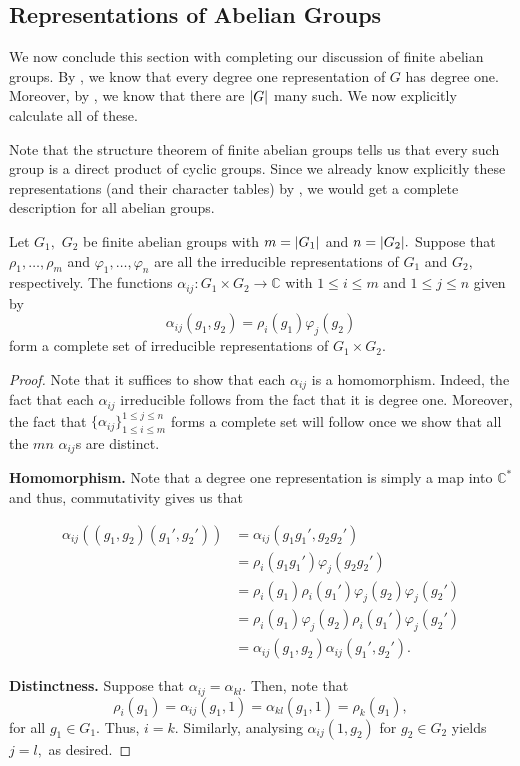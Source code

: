 \subsection{Representations of Abelian Groups}
We now conclude this section with completing our discussion of finite abelian groups. By , we know that every degree one representation of $G$ has degree one. Moreover, by , we know that there are ${\left\lvert G \right\lvert}$ many such. We now explicitly calculate all of these.

Note that the structure theorem of finite abelian groups tells us that every such group is a direct product of cyclic groups. Since we already know explicitly these representations (and their character tables) by , we would get a complete description for all abelian groups.

\begin{prop}
	Let $G_1,$ $G_2$ be finite abelian groups with $m = {\left\lvert G_1 \right\lvert}$ and $n = {\left\lvert G_2 \right\lvert}.$ Suppose that $\rho_1, \ldots, \rho_m$ and $\varphi_1, \ldots, \varphi_n$ are all the irreducible representations of $G_1$ and $G_2,$ respectively. The functions $\alpha_{ij} : G_1 \times G_2 \to \mathbb{C}$ with $1 \le i \le m$ and $1 \le j \le n$ given by
	\begin{equation*} 
		\alpha_{ij}(g_1, g_2) = \rho_i(g_1)\varphi_j(g_2)
	\end{equation*}
	form a complete set of irreducible representations of $G_1 \times G_2.$
\end{prop}
\begin{proof} 
	Note that it suffices to show that each $\alpha_{ij}$ is a homomorphism. Indeed, the fact that each $\alpha_{ij}$ irreducible follows from the fact that it is degree one. Moreover, the fact that $\{\alpha_{ij}\}_{1 \le i \le m}^{1 \le j \le n}$ forms a complete set will follow once we show that all the $mn$ $\alpha_{ij}$s are distinct.

	\textbf{Homomorphism.} Note that a degree one representation is simply a map into $\mathbb{C}^*$ and thus, commutativity gives us that

	\begin{align*} 
		\alpha_{ij}\left((g_1, g_2)(g_1', g_2')\right) &= \alpha_{ij}(g_1g_1', g_2g_2')\\
		&= \rho_i(g_1g_1')\varphi_j(g_2g_2')\\
		&= \rho_i(g_1)\rho_i(g_1')\varphi_j(g_2)\varphi_j(g_2')\\
		&= \rho_i(g_1)\varphi_j(g_2)\rho_i(g_1')\varphi_j(g_2')\\
		&= \alpha_{ij}(g_1, g_2)\alpha_{ij}(g_1', g_2').
	\end{align*}

	\textbf{Distinctness.} Suppose that $\alpha_{ij} = \alpha_{kl}.$ Then, note that
	\begin{equation*} 
		\rho_i(g_1) = \alpha_{ij}(g_1, 1) = \alpha_{kl}(g_1, 1) = \rho_k(g_1),
	\end{equation*}
	for all $g_1 \in G_1.$ Thus, $i = k.$ Similarly, analysing $\alpha_{ij}(1, g_2)$ for $g_2 \in G_2$ yields $j = l,$ as desired.	
\end{proof}

